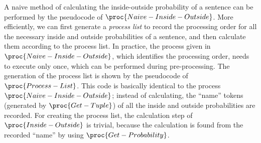 \documentclass[english]{jnlp_1.4}
\begin{document}
A naive method of calculating the inside-outside probability of a sentence can be performed by the pseudocode of $\proc{Naive-Inside-Outside}$. More efficiently, we can first generate a {\it process list} to record the processing order for all the necessary inside and outside probabilities of a sentence, and then calculate them according to the process list. In practice, the process given in $\proc{Naive-Inside-Outside}$, which identifies the processing order, needs to execute only once, which can be performed during pre-processing. The generation of the process list is shown by the pseudocode of $\proc{Process-List}$. This code is basically identical to the process $\proc{Naive-Inside-Outside}$; instead of calculating, the ``name'' tokens (generated by $\proc{Get-Tuple}$) of all the inside and outside probabilities are recorded. For creating the process list, the calculation step of $\proc{Inside-Outside}$ is trivial, because the calculation is found from the recorded ``name'' by using $\proc{Get-Probability}$.
\end{document}
